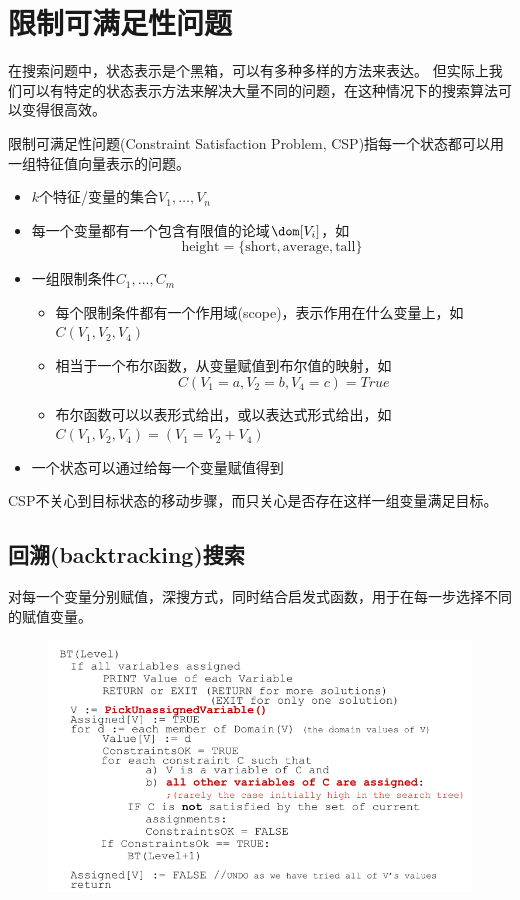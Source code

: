 
\section{限制可满足性问题}
在搜索问题中，状态表示是个黑箱，可以有多种多样的方法来表达。
但实际上我们可以有特定的状态表示方法来解决大量不同的问题，在这种情况下的搜索算法可以变得很高效。

限制可满足性问题(Constraint Satisfaction Problem, CSP)指每一个状态都可以用一组特征值向量表示的问题。
\begin{itemize}
	\item $k$个特征/变量的集合$V_1,\ldots,V_n$
	\item 每一个变量都有一个包含有限值的论域$\dom[V_i]$，如
	\[\text{height}=\{\text{short},\text{average},\text{tall}\}\]
	\item 一组限制条件$C_1,\ldots,C_m$
	\begin{itemize}
		\item 每个限制条件都有一个作用域(scope)，表示作用在什么变量上，如$C(V_1,V_2,V_4)$
		\item 相当于一个布尔函数，从变量赋值到布尔值的映射，如
		\[C(V_1=a,V_2=b,V_4=c)=True\]
		\item 布尔函数可以以表形式给出，或以表达式形式给出，如$C(V_1,V_2,V_4)=(V_1=V_2+V_4)$
	\end{itemize}
	\item 一个状态可以通过给每一个变量赋值得到
\end{itemize}

CSP不关心到目标状态的移动步骤，而只关心是否存在这样一组变量满足目标。

\subsection{回溯(backtracking)搜索}
对每一个变量分别赋值，深搜方式，同时结合启发式函数，用于在每一步选择不同的赋值变量。
\begin{figure}[H]
\centering
\includegraphics[width=0.6\linewidth]{fig/backtracking.png}
\end{figure}

